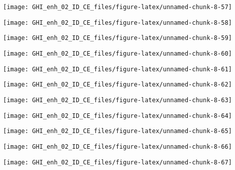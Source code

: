 \documentclass[
  10pt,
  a4paper,oneside]{article}
\begin{document}
\begin{center}\texttt{[image: GHI\_enh\_02\_ID\_CE\_files/figure-latex/unnamed-chunk-8-57]} \end{center}

\begin{center}\texttt{[image: GHI\_enh\_02\_ID\_CE\_files/figure-latex/unnamed-chunk-8-58]} \end{center}

\begin{center}\texttt{[image: GHI\_enh\_02\_ID\_CE\_files/figure-latex/unnamed-chunk-8-59]} \end{center}

\begin{center}\texttt{[image: GHI\_enh\_02\_ID\_CE\_files/figure-latex/unnamed-chunk-8-60]} \end{center}

\begin{center}\texttt{[image: GHI\_enh\_02\_ID\_CE\_files/figure-latex/unnamed-chunk-8-61]} \end{center}

\begin{center}\texttt{[image: GHI\_enh\_02\_ID\_CE\_files/figure-latex/unnamed-chunk-8-62]} \end{center}

\begin{center}\texttt{[image: GHI\_enh\_02\_ID\_CE\_files/figure-latex/unnamed-chunk-8-63]} \end{center}

\begin{center}\texttt{[image: GHI\_enh\_02\_ID\_CE\_files/figure-latex/unnamed-chunk-8-64]} \end{center}

\begin{center}\texttt{[image: GHI\_enh\_02\_ID\_CE\_files/figure-latex/unnamed-chunk-8-65]} \end{center}

\begin{center}\texttt{[image: GHI\_enh\_02\_ID\_CE\_files/figure-latex/unnamed-chunk-8-66]} \end{center}

\begin{center}\texttt{[image: GHI\_enh\_02\_ID\_CE\_files/figure-latex/unnamed-chunk-8-67]} \end{center}
\end{document}
